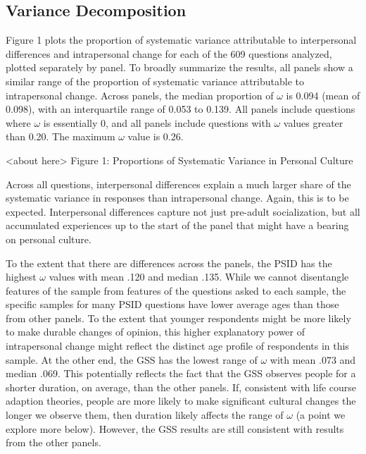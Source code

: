 \documentclass[
  12pt,
]{article}
\begin{document}
\hypertarget{variance-decomposition}{%
\subsection{Variance Decomposition}\label{variance-decomposition}}

Figure 1 plots the proportion of systematic variance attributable to
interpersonal differences and intrapersonal change for each of the 609
questions analyzed, plotted separately by panel. To broadly summarize
the results, all panels show a similar range of the proportion of
systematic variance attributable to intrapersonal change. Across panels,
the median proportion of \(\omega\) is 0.094 (mean of 0.098), with an
interquartile range of 0.053 to 0.139. All panels include questions
where \(\omega\) is essentially 0, and all panels include questions with
\(\omega\) values greater than 0.20. The maximum \(\omega\) value is
0.26.

\begin{center}
<about here>
Figure 1: Proportions of Systematic Variance in Personal Culture
\end{center}

Across all questions, interpersonal differences explain a much larger
share of the systematic variance in responses than intrapersonal change.
Again, this is to be expected. Interpersonal differences capture not
just pre-adult socialization, but all accumulated experiences up to the
start of the panel that might have a bearing on personal culture.

To the extent that there are differences across the panels, the PSID has
the highest \(\omega\) values with mean .120 and median .135. While we
cannot disentangle features of the sample from features of the questions
asked to each sample, the specific samples for many PSID questions have
lower average ages than those from other panels. To the extent that
younger respondents might be more likely to make durable changes of
opinion, this higher explanatory power of intrapersonal change might
reflect the distinct age profile of respondents in this sample. At the
other end, the GSS has the lowest range of \(\omega\) with mean .073 and
median .069. This potentially reflects the fact that the GSS observes
people for a shorter duration, on average, than the other panels. If,
consistent with life course adaption theories, people are more likely to
make significant cultural changes the longer we observe them, then
duration likely affects the range of \(\omega\) (a point we explore more
below). However, the GSS results are still consistent with results from
the other panels.
\end{document}
